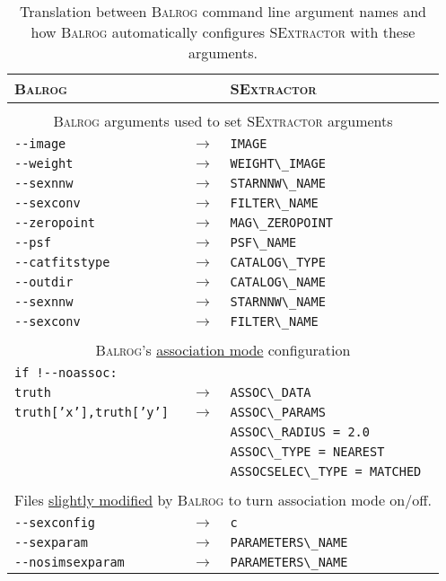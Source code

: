 \documentclass[11pt]{book}
\newcommand{\codett}[1]{\lstinline{#1}}
\newcommand{\balrog}{\textsc{Balrog}}
\newcommand{\sex}{\textsc{SExtractor}}
\newcommand{\opt}[1]{\codett{--#1}}
\begin{document}
\begin{table}[h]
\caption{Translation between \balrog{} command line argument names and how \balrog{} automatically configures
\sex{} with these arguments.} \label{tab:b2s}
\begin{tabular}{l l l} \toprule %

\rowcolor{gray2} \textbf{\balrog{}} & & \textbf{\sex{}} \\ \midrule 
\rowcolor{white} & & \\
\multicolumn{3}{c}{\balrog{} arguments used to set \sex{} arguments} \\
\opt{image} & $\rightarrow$ & \codett{IMAGE} \\
\opt{weight} &  $\rightarrow$ & \codett{WEIGHT\_IMAGE}\\
\opt{sexnnw} & $\rightarrow$ & \codett{STARNNW\_NAME} \\
\opt{sexconv} & $\rightarrow$ & \codett{FILTER\_NAME} \\
\opt{zeropoint} & $\rightarrow$ & \codett{MAG\_ZEROPOINT} \\
\opt{psf} & $\rightarrow$ & \codett{PSF\_NAME} \\
\opt{catfitstype} & $\rightarrow$ & \codett{CATALOG\_TYPE} \\
\opt{outdir} & $\rightarrow$ & \codett{CATALOG\_NAME} \\ 
\opt{sexnnw} & $\rightarrow$ & \codett{STARNNW\_NAME} \\ 
\opt{sexconv} & $\rightarrow$ & \codett{FILTER\_NAME} \\ 

\rowcolor{white} & & \\
\multicolumn{3}{c}{\balrog{}'s \hyperlink{hyper:assoc}{association mode} configuration} \\
\rowcolor{gray1} \codett{if !--noassoc:} & & \\
\rowcolor{gray1} \texttt{truth} & $\rightarrow$ & \codett{ASSOC\_DATA} \\
\rowcolor{gray1} \texttt{truth['x'],truth['y']} & $\rightarrow$ & \codett{ASSOC\_PARAMS} \\
\rowcolor{gray1} & & \codett{ASSOC\_RADIUS = 2.0} \\
\rowcolor{gray1} & & \codett{ASSOC\_TYPE = NEAREST} \\
\rowcolor{gray1} & & \codett{ASSOCSELEC\_TYPE = MATCHED} \\
\rowcolor{white} & & \\
\multicolumn{3}{c}{Files \hyperlink{hyper:sexfiles}{slightly modified} by \balrog{} to turn association mode on/off.} \\
\opt{sexconfig} & $\rightarrow$  &\codett{c} \\
\opt{sexparam} & $\rightarrow$  &\codett{PARAMETERS\_NAME} \\ 
\opt{nosimsexparam} & $\rightarrow$  &\codett{PARAMETERS\_NAME} \\ \bottomrule


\end{tabular}
\end{table}
\end{document}
